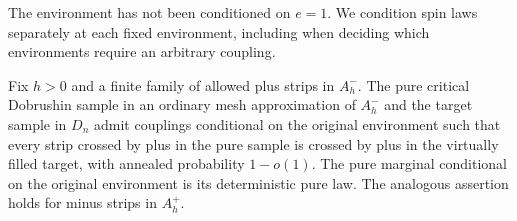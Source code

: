 The environment has not been conditioned on $e=1$.  We condition spin
laws separately at each fixed environment, including when deciding
which environments require an arbitrary coupling.

\begin{proposition}
\label{prop:strip-transfer}
Fix $h>0$ and a finite family of allowed plus strips in $A_h^-$.
The pure critical Dobrushin sample in an ordinary mesh approximation
of $A_h^-$ and the target sample in $D_n$ admit couplings conditional
on the original environment such that every strip crossed by plus in
the pure sample is crossed by plus in the virtually filled target,
with annealed probability $1-o(1)$.  The pure marginal conditional on
the original environment is its deterministic pure law.  The analogous
assertion holds for minus strips in $A_h^+$.
\end{proposition}

